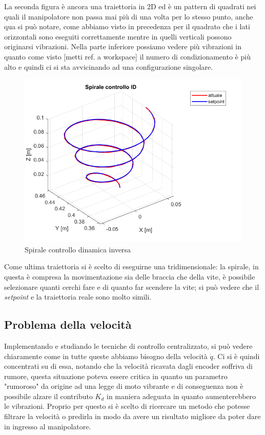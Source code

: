 La seconda figura è ancora una traiettoria in 2D ed è un pattern di quadrati nei quali il manipolatore non passa mai più di una volta per lo stesso punto, anche qua si può notare, come abbiamo visto in precedenza per il quadrato che i lati orizzontali sono eseguiti correttamente mentre in quelli verticali possono originarsi vibrazioni. Nella parte inferiore possiamo vedere più vibrazioni in quanto come visto [metti ref. a workspace] il numero di condizionamento è più alto e quindi ci si sta avvicinando ad una configurazione singolare.
\begin{figure}[ht]
	\begin{center}
		\includegraphics[scale=0.45]{Immagini/Traiettorie/SpiraleID}
		\caption{Spirale controllo dinamica inversa}
		\label{fig:SpiraleID}
	\end{center}
\end{figure}
Come ultima traiettoria si è scelto di eseguirne una tridimensionale: la spirale, in questa è compresa la movimentazione sia delle braccia che della vite, è possibile selezionare quanti cerchi fare e di quanto far scendere la vite; si può vedere che il \textit{setpoint} e la traiettoria reale sono molto simili.
\subsection{Problema della velocità}
Implementando e studiando le tecniche di controllo centralizzato, si può vedere chiaramente come in tutte queste abbiamo bisogno della velocità $\dot{q}$. Ci si è quindi concentrati su di essa, notando che la velocità ricavata dagli encoder soffriva di rumore, questa situazione poteva essere critica in quanto un parametro "rumoroso" da origine ad una legge di moto vibrante e di conseguenza non è possibile alzare il contributo $K_d$ in maniera adeguata in quanto aumenterebbero le vibrazioni. Proprio per questo si è scelto di ricercare un metodo che potesse filtrare la velocità o predirla in modo da avere un risultato migliore da poter dare in ingresso al manipolatore.
